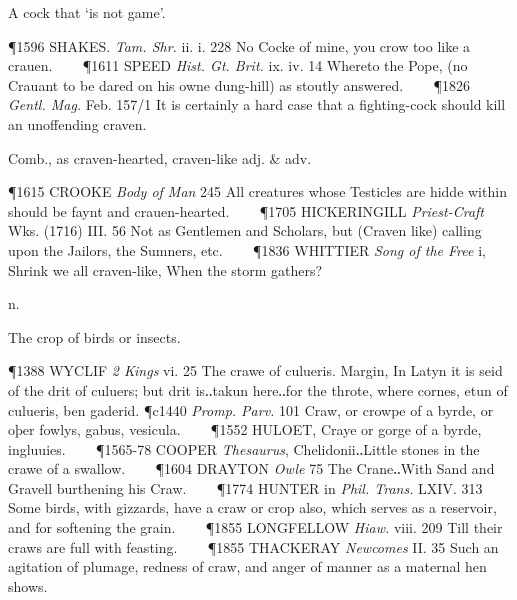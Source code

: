 \begin{description}[wide, labelwidth=!, labelindent=0pt]
\begin{myenumerate}
 A cock that ‘is not game’.

\P 1596 SHAKES.  \textit{Tam. Shr.} ii. i. 228 No Cocke of mine, you crow too like a crauen.    
\P 1611 SPEED  \textit{Hist. Gt. Brit.} ix. iv. 14 Whereto the Pope, (no Crauant to be dared on his owne dung-hill) as stoutly answered.    
\P 1826  \textit{Gentl. Mag.} Feb. 157/1 It is certainly a hard case that a fighting-cock should kill an unoffending craven.

 Comb., as craven-hearted, craven-like adj. \& adv.

\P 1615 CROOKE  \textit{Body of Man} 245 All creatures whose Testicles are hidde within should be faynt and crauen-hearted.    
\P 1705 HICKERINGILL  \textit{Priest-Craft} Wks. (1716) III. 56 Not as Gentlemen and Scholars, but (Craven like) calling upon the Jailors, the Sumners, etc.    
\P 1836 WHITTIER  \textit{Song of the Free} i, Shrink we all craven-like, When the storm gathers?
\end{myenumerate}


 n.

\noindent {}

\vspace{-0.3cm}

\begin{myenumerate}

 The crop of birds or insects.

\P 1388 WYCLIF  \textit{2 Kings} vi. 25 The crawe of culueris. Margin, In Latyn it is seid of the drit of culuers; but drit is‥takun here‥for the throte, where cornes, etun of culueris, ben gaderid.
\P c1440  \textit{Promp. Parv.} 101 Craw, or crowpe of a byrde, or oþer fowlys, gabus, vesicula.    
\P 1552 HULOET,  Craye or gorge of a byrde, ingluuies.    
\P 1565-78 COOPER  \textit{Thesaurus}, Chelidonii‥Little stones in the crawe of a swallow.    
\P 1604 DRAYTON  \textit{Owle} 75 The Crane‥With Sand and Gravell burthening his Craw.    
\P 1774 HUNTER in  \textit{Phil. Trans.} LXIV. 313 Some birds, with gizzards, have a craw or crop also, which serves as a reservoir, and for softening the grain.    
\P 1855 LONGFELLOW  \textit{Hiaw.} viii. 209 Till their craws are full with feasting.    
\P 1855 THACKERAY  \textit{Newcomes} II. 35 Such an agitation of plumage, redness of craw, and anger of manner as a maternal hen shows.


\end{myenumerate}
\end{description}
